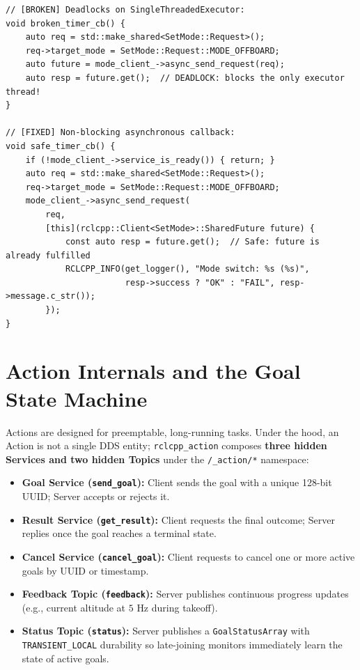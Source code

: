 \documentclass{article}
\begin{document}
\begin{verbatim}
// [BROKEN] Deadlocks on SingleThreadedExecutor:
void broken_timer_cb() {
    auto req = std::make_shared<SetMode::Request>();
    req->target_mode = SetMode::Request::MODE_OFFBOARD;
    auto future = mode_client_->async_send_request(req);
    auto resp = future.get();  // DEADLOCK: blocks the only executor thread!
}

// [FIXED] Non-blocking asynchronous callback:
void safe_timer_cb() {
    if (!mode_client_->service_is_ready()) { return; }
    auto req = std::make_shared<SetMode::Request>();
    req->target_mode = SetMode::Request::MODE_OFFBOARD;
    mode_client_->async_send_request(
        req,
        [this](rclcpp::Client<SetMode>::SharedFuture future) {
            const auto resp = future.get();  // Safe: future is already fulfilled
            RCLCPP_INFO(get_logger(), "Mode switch: %s (%s)",
                        resp->success ? "OK" : "FAIL", resp->message.c_str());
        });
}
\end{verbatim}

\section{Action Internals and the Goal State Machine}
Actions are designed for preemptable, long-running tasks. Under the hood, an Action is not a single DDS entity; \texttt{rclcpp\_action} composes \textbf{three hidden Services and two hidden Topics} under the \texttt{/\_action/*} namespace:
\begin{itemize}
    \item \textbf{Goal Service (\texttt{send\_goal}):} Client sends the goal with a unique 128-bit UUID; Server accepts or rejects it.
    \item \textbf{Result Service (\texttt{get\_result}):} Client requests the final outcome; Server replies once the goal reaches a terminal state.
    \item \textbf{Cancel Service (\texttt{cancel\_goal}):} Client requests to cancel one or more active goals by UUID or timestamp.
    \item \textbf{Feedback Topic (\texttt{feedback}):} Server publishes continuous progress updates (e.g., current altitude at $5\text{ Hz}$ during takeoff).
    \item \textbf{Status Topic (\texttt{status}):} Server publishes a \texttt{GoalStatusArray} with \texttt{TRANSIENT\_LOCAL} durability so late-joining monitors immediately learn the state of active goals.
\end{itemize}
\end{document}
